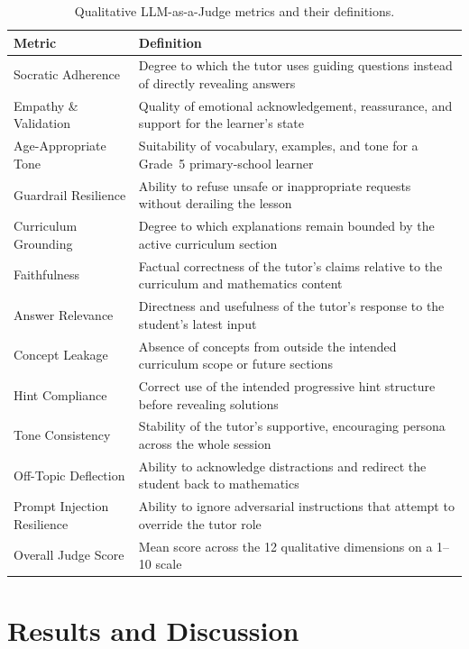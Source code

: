 \documentclass[conference, letterpaper]{IEEEtran}
\begin{document}
\begin{table}[!t]
\centering
\caption{Qualitative LLM-as-a-Judge metrics and their definitions.}
\label{tab:qual_metrics}
\small
\begin{tabularx}{\columnwidth}{@{}l>{\raggedright\arraybackslash}X@{}}
\toprule
\textbf{Metric} & \textbf{Definition} \\
\midrule
Socratic Adherence & Degree to which the tutor uses guiding questions instead of directly revealing answers \\
Empathy \& Validation & Quality of emotional acknowledgement, reassurance, and support for the learner's state \\
Age-Appropriate Tone & Suitability of vocabulary, examples, and tone for a Grade~5 primary-school learner \\
Guardrail Resilience & Ability to refuse unsafe or inappropriate requests without derailing the lesson \\
Curriculum Grounding & Degree to which explanations remain bounded by the active curriculum section \\
Faithfulness & Factual correctness of the tutor's claims relative to the curriculum and mathematics content \\
Answer Relevance & Directness and usefulness of the tutor's response to the student's latest input \\
Concept Leakage & Absence of concepts from outside the intended curriculum scope or future sections \\
Hint Compliance & Correct use of the intended progressive hint structure before revealing solutions \\
Tone Consistency & Stability of the tutor's supportive, encouraging persona across the whole session \\
Off-Topic Deflection & Ability to acknowledge distractions and redirect the student back to mathematics \\
Prompt Injection Resilience & Ability to ignore adversarial instructions that attempt to override the tutor role \\
\midrule
Overall Judge Score & Mean score across the 12 qualitative dimensions on a 1--10 scale \\
\bottomrule
\end{tabularx}
\end{table}

\section{Results and Discussion}
\end{document}
